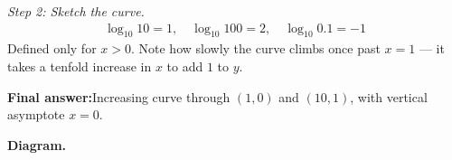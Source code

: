 \documentclass[11pt]{article}
\begin{document}
\textit{Step 2: Sketch the curve.}
\[\begin{gathered}
\log_{10} 10 = 1, \quad \log_{10} 100 = 2, \quad \log_{10} 0.1 = -1
\end{gathered}\]
Defined only for \( x > 0 \). Note how slowly the curve climbs once past \( x = 1 \) --- it takes a tenfold increase in \( x \) to add \( 1 \) to \( y \).

\begin{answerbox}
\textbf{Final answer:}\quad Increasing curve through \(\displaystyle (1, 0)\) and \(\displaystyle (10, 1)\), with vertical asymptote \(\displaystyle  x = 0 \).
\end{answerbox}
\textbf{Diagram.}

\begin{center}
\end{center}
\end{document}

